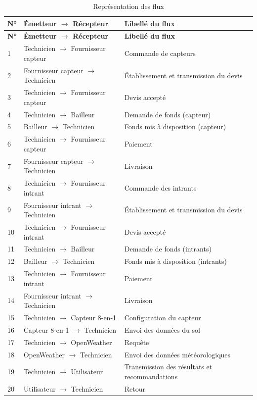 \begin{longtable}{|p{1cm}|p{6.5cm}|p{6.5cm}|}
    \caption{Représentation des flux}
    \label{tab:flux} \\
    \hline
    \textbf{N°} & \textbf{Émetteur $\rightarrow$ Récepteur} & \textbf{Libellé du flux} \\
    \hline
    \endfirsthead
    \hline
    \textbf{N°} & \textbf{Émetteur $\rightarrow$ Récepteur} & \textbf{Libellé du flux} \\
    \hline
    \endhead
    1 & Technicien $\rightarrow$ Fournisseur capteur & Commande de capteurs \\
    \hline
    2 & Fournisseur capteur $\rightarrow$ Technicien & Établissement et transmission du devis \\
    \hline
    3 & Technicien $\rightarrow$ Fournisseur capteur & Devis accepté \\
    \hline
    4 & Technicien $\rightarrow$ Bailleur & Demande de fonds (capteur) \\
    \hline
    5 & Bailleur $\rightarrow$ Technicien & Fonds mis à disposition (capteur) \\
    \hline
    6 & Technicien $\rightarrow$ Fournisseur capteur & Paiement \\
    \hline
    7 & Fournisseur capteur $\rightarrow$ Technicien & Livraison \\
    \hline
    8 & Technicien $\rightarrow$ Fournisseur intrant & Commande des intrants \\
    \hline
    9 & Fournisseur intrant $\rightarrow$ Technicien & Établissement et transmission du devis \\
    \hline
    10 & Technicien $\rightarrow$ Fournisseur intrant & Devis accepté \\
    \hline
    11 & Technicien $\rightarrow$ Bailleur & Demande de fonds (intrants) \\
    \hline
    12 & Bailleur $\rightarrow$ Technicien & Fonds mis à disposition (intrants) \\
    \hline
    13 & Technicien $\rightarrow$ Fournisseur intrant & Paiement \\
    \hline
    14 & Fournisseur intrant $\rightarrow$ Technicien & Livraison \\
    \hline
    15 & Technicien $\rightarrow$ Capteur 8-en-1 & Configuration du capteur \\
    \hline
    16 & Capteur 8-en-1 $\rightarrow$ Technicien & Envoi des données du sol \\
    \hline
    17 & Technicien $\rightarrow$ OpenWeather & Requête \\
    \hline
    18 & OpenWeather $\rightarrow$ Technicien & Envoi des données météorologiques \\
    \hline
    19 & Technicien $\rightarrow$ Utilisateur & Transmission des résultats et recommandations \\
    \hline
    20 & Utilisateur $\rightarrow$ Technicien & Retour \\
    \hline
\end{longtable}

